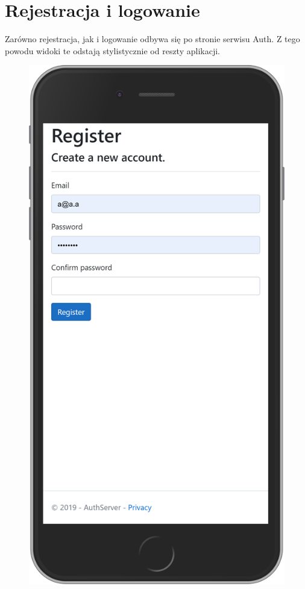 \section{Rejestracja i logowanie}
	Zarówno rejestracja, jak i logowanie odbywa się po stronie serwisu Auth.
	Z tego powodu widoki te odstają stylistycznie od reszty aplikacji.
	\begin{figure}[H]
		\centering
		\begin{minipage}{.5\textwidth}
			\includegraphics[width=0.9\linewidth]{rys06/register.png}

\end{minipage}
\end{figure}
